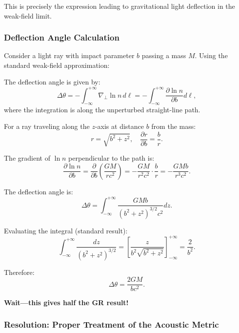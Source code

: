 \documentclass[11pt,a4paper]{article}
\theoremstyle{definition}
\theoremstyle{remark}
\begin{document}
This is precisely the expression leading to gravitational light deflection in the weak-field limit.

\subsubsection{Deflection Angle Calculation}

Consider a light ray with impact parameter $b$ passing a mass $M$. Using the standard weak-field approximation:

The deflection angle is given by:
\begin{equation}
\Delta\theta = -\int_{-\infty}^{+\infty} \nabla_\perp \ln n \, d\ell = -\int_{-\infty}^{+\infty} \frac{\partial \ln n}{\partial b} d\ell,
\end{equation}
where the integration is along the unperturbed straight-line path.

For a ray traveling along the $z$-axis at distance $b$ from the mass:
\begin{equation}
r = \sqrt{b^2 + z^2}, \quad \frac{\partial r}{\partial b} = \frac{b}{r}.
\end{equation}

The gradient of $\ln n$ perpendicular to the path is:
\begin{equation}
\frac{\partial \ln n}{\partial b} = \frac{\partial}{\partial b}\left(\frac{GM}{rc^2}\right) = -\frac{GM}{r^2 c^2} \cdot \frac{b}{r} = -\frac{GM b}{r^3 c^2}.
\end{equation}

The deflection angle is:
\begin{equation}
\Delta\theta = \int_{-\infty}^{+\infty} \frac{GM b}{(b^2 + z^2)^{3/2} c^2} dz.
\end{equation}

Evaluating the integral (standard result):
\begin{equation}
\int_{-\infty}^{+\infty} \frac{dz}{(b^2 + z^2)^{3/2}} = \left[\frac{z}{b^2\sqrt{b^2 + z^2}}\right]_{-\infty}^{+\infty} = \frac{2}{b^2}.
\end{equation}

Therefore:
\begin{equation}
\Delta\theta = \frac{2GM}{bc^2}.
\end{equation}

\textbf{Wait---this gives half the GR result!}

\subsubsection{Resolution: Proper Treatment of the Acoustic Metric}
\end{document}
